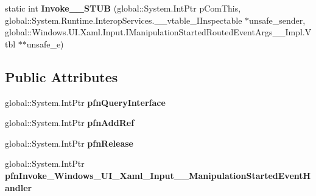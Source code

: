 \begin{DoxyCompactItemize}
\item 
\mbox{\label{struct_windows_1_1_u_i_1_1_xaml_1_1_input_1_1_manipulation_started_event_handler_____impl_1_1_vtbl_adf8a1eb6db03289ec3d2281fc6609817}} 
static int {\bfseries Invoke\+\_\+\+\_\+\+S\+T\+UB} (global\+::\+System.\+Int\+Ptr p\+Com\+This, global\+::\+System.\+Runtime.\+Interop\+Services.\+\_\+\+\_\+vtable\+\_\+\+I\+Inspectable $\ast$unsafe\+\_\+sender, global\+::\+Windows.\+U\+I.\+Xaml.\+Input.\+I\+Manipulation\+Started\+Routed\+Event\+Args\+\_\+\+\_\+\+Impl.\+Vtbl $\ast$$\ast$unsafe\+\_\+e)
\end{DoxyCompactItemize}
\subsection*{Public Attributes}
\begin{DoxyCompactItemize}
\item 
\mbox{\label{struct_windows_1_1_u_i_1_1_xaml_1_1_input_1_1_manipulation_started_event_handler_____impl_1_1_vtbl_a7401e8d7d7bb8ea7b108eca87921338d}} 
global\+::\+System.\+Int\+Ptr {\bfseries pfn\+Query\+Interface}
\item 
\mbox{\label{struct_windows_1_1_u_i_1_1_xaml_1_1_input_1_1_manipulation_started_event_handler_____impl_1_1_vtbl_a7a02535b0af304ee08dff3538cde1ea9}} 
global\+::\+System.\+Int\+Ptr {\bfseries pfn\+Add\+Ref}
\item 
\mbox{\label{struct_windows_1_1_u_i_1_1_xaml_1_1_input_1_1_manipulation_started_event_handler_____impl_1_1_vtbl_af8f5307cb29d347aee0980aaeac355a4}} 
global\+::\+System.\+Int\+Ptr {\bfseries pfn\+Release}
\item 
\mbox{\label{struct_windows_1_1_u_i_1_1_xaml_1_1_input_1_1_manipulation_started_event_handler_____impl_1_1_vtbl_a422ba62951da55b0e832521d178e95a3}} 
global\+::\+System.\+Int\+Ptr {\bfseries pfn\+Invoke\+\_\+\+Windows\+\_\+\+U\+I\+\_\+\+Xaml\+\_\+\+Input\+\_\+\+\_\+\+Manipulation\+Started\+Event\+Handler}
\end{DoxyCompactItemize}
